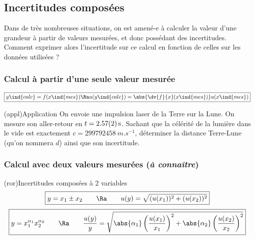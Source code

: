 \documentclass[../../main/main.tex]{subfiles}
\begin{document}
\subsection{Incertitudes composées}
Dans de très nombreuses situations, on est amené-e à calculer la valeur d'une
grandeur à partir de valeurs mesurées, et donc possédant des incertitudes.
Comment exprimer alors l'incertitude sur ce calcul en fonction de celles sur les
données utilisées ?

\subsubsection{Calcul à partir d'une seule valeur mesurée}
\[
	\boxed{y\ind{calc} = f(x\ind{mes}) \Ra u(y\ind{calc}) =
		\abs{\dv{f}{x}(x\ind{mes})}u(x\ind{mes})}
\]

\begin{tcb*}[breakable](appl){Application}
	On envoie une impulsion laser de la Terre sur la Lune. On mesure son
	aller-retour en $t = \SI{2.57 \pm 0.02}{s}$. Sachant que la célérité de la
	lumière dans le vide est exactement $c = \SI{299792458}{m.s^{-1}}$, déterminer
	la distance Terre-Lune (qu'on nommera $d$) ainsi que son incertitude.
	\tcblower
	\vspace*{-10pt}
	\begin{isd}
		\vspace*{-10pt}
		\tcblower
		\vspace*{-10pt}
	\end{isd}
\end{tcb*}

\subsubsection{Calcul avec deux valeurs mesurées (\textit{à connaître})}
\begin{tcb*}(ror){Incertitudes composées à 2 variables}
	\[
		\boxed{
			y = x_1 \pm x_2
			\qquad \Ra \qquad
			u(y) = \sqrt{(u(x_1))^{2} + (u(x_2))^{2}}}
	\]
	\tcblower
	\[
		\boxed{
		y = x_1^{\alpha_1}x_2^{\alpha_2}
		\qquad \Ra \qquad
		\frac{u(y)}{y} = \sqrt{
			\abs{\alpha_1}\left(\frac{u(x_1)}{x_1}\right)^{2} +
			\abs{\alpha_2}\left(\frac{u(x_2)}{x_2}\right)^{2}
		}
		}
	\]
\end{tcb*}
\end{document}
